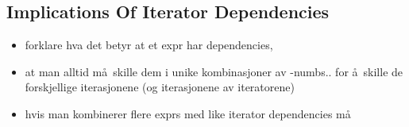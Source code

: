 \subsection{Implications Of Iterator Dependencies}
\label{sect:trans:TD:implic}

\begin{itemize}
  \item forklare hva det betyr at et expr har dependencies,
  \item at man alltid m\aa~skille dem i unike kombinasjoner av -numbs.. for \aa~skille de forskjellige
  iterasjonene (og iterasjonene av iteratorene)
  \item hvis man kombinerer flere exprs med like iterator dependencies m\aa~
\end{itemize}
